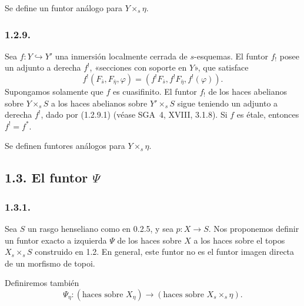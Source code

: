 Se define un funtor análogo para $Y\times_s\eta$.

\subsubsection*{1.2.9.}
Sea $f:Y\hookrightarrow Y'$ una inmersión localmente cerrada de
$s$-esquemas. El funtor $f_!$ posee un adjunto a derecha $f^!$, «secciones con
soporte en $Y$», que satisface
\begin{equation}\tag{1.2.9.1}
f^!(F_{\bar s},F_{\bar\eta},\varphi)
=(f^!F_{\bar s},f^!F_{\bar\eta},f^!(\varphi)).
\end{equation}
Supongamos solamente que $f$ es cuasifinito. El funtor $f_!$ de los haces
abelianos sobre $Y\times_sS$ a los haces abelianos sobre $Y'\times_sS$ sigue
teniendo un adjunto a derecha $f^!$, dado por (1.2.9.1) (véase SGA~4, XVIII,
3.1.8). Si $f$ es étale, entonces $f^!=f^*$.

Se definen funtores análogos para $Y\times_s\eta$.

\pageoriginale

\subsection*{\texorpdfstring{1.3. El funtor $\Psi$}{1.3. El funtor Psi}}

\subsubsection*{1.3.1.}
Sea $S$ un rasgo henseliano como en 0.2.5, y sea
$p:X\longrightarrow S$. Nos proponemos definir un funtor exacto a izquierda
$\Psi$ de los haces sobre $X$ a los haces sobre el topos $X_s\times_sS$
construido en 1.2. En general, este funtor no es el funtor imagen directa de
un morfismo de topoi.

Definiremos también
\begin{equation*}
\Psi_\eta:(\text{haces sobre }X_\eta)
\longrightarrow(\text{haces sobre }X_s\times_s\eta).
\end{equation*}

